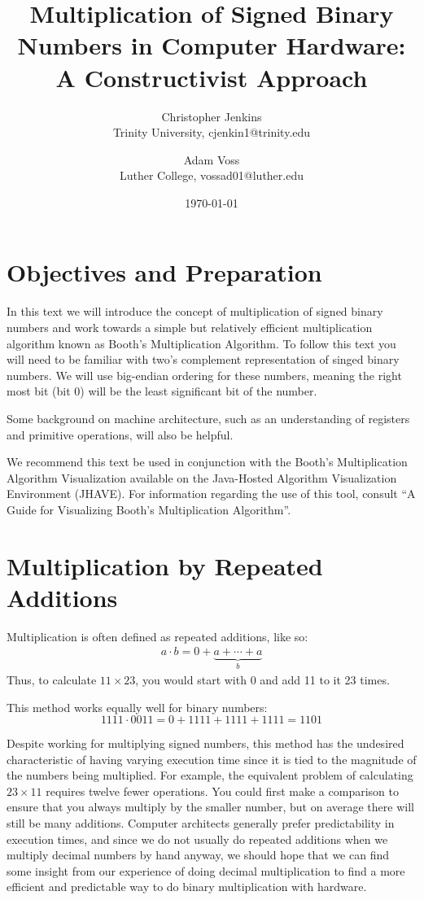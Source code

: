 \documentclass{article}
\title{Multiplication of Signed Binary Numbers in Computer Hardware: A Constructivist Approach}
\date{\today}
\author{Christopher Jenkins\\ Trinity University, cjenkin1@trinity.edu
    \and Adam Voss\\ Luther College, vossad01@luther.edu}
\begin{document}
\maketitle
\tableofcontents

\pagebreak

\section{Objectives and Preparation}
In this text we will introduce the concept of multiplication of signed binary numbers and work towards a simple but relatively efficient multiplication algorithm known as Booth's Multiplication Algorithm.
To follow this text you will need to be familiar with two's complement representation of singed binary numbers.
We will use big-endian ordering for these numbers, meaning the right most bit (bit 0) will be the least significant bit of the number.

Some background on machine architecture, such as an understanding of registers and primitive operations, will also be helpful.

We recommend this text be used in conjunction with the Booth’s Multiplication Algorithm Visualization available on the Java-Hosted Algorithm Visualization Environment (JHAVE).
For information regarding the use of this tool, consult ``A Guide for Visualizing Booth’s Multiplication Algorithm''.

\section{Multiplication by Repeated Additions}
Multiplication is often defined as repeated additions, like so: \begin{align}
a \cdot b = 0 + \underbrace{a + \cdots + a}_{b} %
\end{align}
Thus, to calculate $11 \times 23$, you would start with 0 and add 11 to it 23 times.

This method works equally well for binary numbers: %
\begin{equation}
1111 \cdot 0011 = 0 + 1111 + 1111 + 1111 = 1101
\end{equation}

Despite working for multiplying signed numbers, this method has the undesired characteristic of having varying execution time since it is tied to the magnitude of the numbers being multiplied.
For example, the equivalent problem of calculating $23 \times 11$ requires twelve fewer operations.
You could first make a comparison to ensure that you always multiply by the smaller number, but on average there will still be many additions.
Computer architects generally prefer predictability in execution times, and since we do not usually do repeated additions when we multiply decimal numbers by hand anyway, we should hope that we can find some insight from our experience of doing decimal multiplication to find a more efficient and predictable way to do binary multiplication with hardware.
\end{document}
